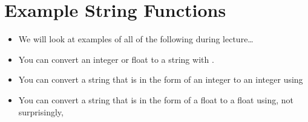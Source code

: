 \documentclass[letterpaper,10pt,english]{sphinxmanual}
\begin{document}
\section{Example String Functions}
\label{\detokenize{lecture_notes/lec03_strings:example-string-functions}}\begin{itemize}
\item {} 
We will look at examples of all of the following during lecture…

\item {} 
You can convert an integer or float to a string with .

\item {} 
You can convert a string that is in the form of an integer to an
integer using 

\item {} 
You can convert a string that is in the form of a float to a float
using, not surprisingly, 

\end{itemize}
\end{document}
